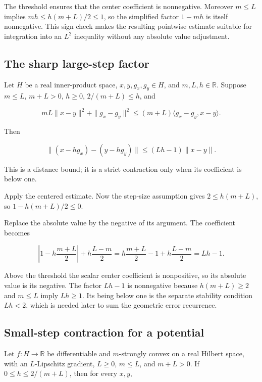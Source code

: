 \documentclass[11pt,a4paper]{article}
\begin{document}
The threshold ensures that the center coefficient is nonnegative. Moreover \(m\le L\) implies \(mh\le h(m+L)/2\le1\), so the simplified factor \(1-mh\) is itself nonnegative. This sign check makes the resulting pointwise estimate suitable for integration into an \(L^2\) inequality without any absolute value adjustment.


\subsection{\texorpdfstring{The sharp large-step factor}{The sharp large-step factor}}


Let \(H\) be a real inner-product space, \(x,y,g_x,g_y\in H\), and \(m,L,h\in\mathbb R\). Suppose \(m\le L\), \(m+L>0\), \(h\ge0\), \(2/(m+L)\le h\), and

\[mL\|x-y\|^2+\|g_x-g_y\|^2\le(m+L)\langle g_x-g_y,x-y\rangle.\]

Then

\[\|(x-hg_x)-(y-hg_y)\|\le(Lh-1)\|x-y\|.\]

This is a distance bound; it is a strict contraction only when its coefficient is below one.



Apply the centered estimate. Now the step-size assumption gives \(2\le h(m+L)\), so \(1-h(m+L)/2\le0\).



Replace the absolute value by the negative of its argument. The coefficient becomes

\[\left|1-h\frac{m+L}{2}\right|+h\frac{L-m}{2}=h\frac{m+L}{2}-1+h\frac{L-m}{2}=Lh-1.\]

Above the threshold the scalar center coefficient is nonpositive, so its absolute value is its negative. The factor \(Lh-1\) is nonnegative because \(h(m+L)\ge2\) and \(m\le L\) imply \(Lh\ge1\). Its being below one is the separate stability condition \(Lh<2\), which is needed later to sum the geometric error recurrence.


\subsection{\texorpdfstring{Small-step contraction for a potential}{Small-step contraction for a potential}}


Let \(f:H\to\mathbb R\) be differentiable and \(m\)-strongly convex on a real Hilbert space, with an \(L\)-Lipschitz gradient, \(L\ge0\), \(m\le L\), and \(m+L>0\). If \(0\le h\le2/(m+L)\), then for every \(x,y\),
\end{document}
